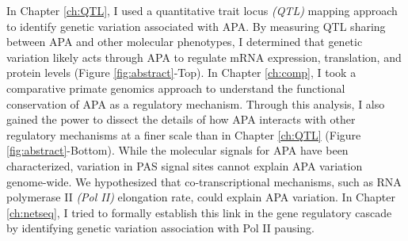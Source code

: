  
 
 In Chapter \ref{ch:QTL}, I used a quantitative trait locus \emph{(QTL)} mapping approach to identify genetic variation associated with APA. By measuring QTL sharing between APA and other molecular phenotypes, I determined that genetic variation likely acts through APA to regulate mRNA expression, translation, and protein levels (Figure \ref{fig:abstract}-Top). In Chapter \ref{ch:comp}, I took a comparative primate genomics approach to understand the functional conservation of APA as a regulatory mechanism. Through this analysis, I also gained the power to dissect the details of how APA interacts with other regulatory mechanisms at a finer scale than in Chapter \ref{ch:QTL} (Figure \ref{fig:abstract}-Bottom). While the molecular signals for APA have been characterized, variation in PAS signal sites cannot explain APA variation genome-wide. We hypothesized that co-transcriptional mechanisms, such as RNA polymerase II \emph{(Pol II)} elongation rate, could explain APA variation. In Chapter \ref{ch:netseq}, I tried to formally establish this link in the gene regulatory cascade by identifying genetic variation association with Pol II pausing.  
 
 
 
